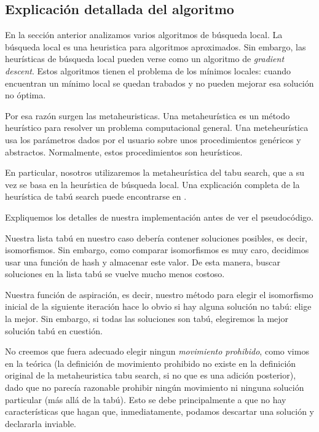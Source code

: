 
\subsection{Explicación detallada del algoritmo}

En la sección anterior analizamos varios algoritmos de búsqueda local.
La búsqueda local es una heuristica para algoritmos aproximados.
Sin embargo, las heurísticas de búsqueda local pueden verse como un algoritmo de \emph{gradient descent}.
Estos algoritmos tienen el problema de los mínimos locales: cuando encuentran un mínimo local se quedan trabados y no pueden mejorar esa solución no óptima. 

Por esa razón surgen las metaheuristicas.
Una metaheurística es un método heurístico para resolver un  problema computacional general.
Una meteheurística usa los parámetros dados por el usuario sobre unos procedimientos genéricos y abstractos. 
Normalmente, estos procedimientos son heurísticos.

En particular, nosotros utilizaremos la metaheurística del tabu search, que a su vez se basa en la heurística de búsqueda local.
Una explicación completa de la heurística de tabú search puede encontrarse en \cite{tabusearch}.

Expliquemos los detalles de nuestra implementación antes de ver el pseudocódigo.

Nuestra lista tabú en nuestro caso debería contener soluciones posibles, es decir, isomorfismos. Sin embargo, como comparar isomorfismos es muy caro, decidimos usar una función de hash y almacenar este valor. De esta manera, buscar soluciones en la lista tabú se vuelve mucho menos costoso.

Nuestra función de aspiración, es decir, nuestro método para elegir el isomorfismo inicial de la siguiente iteración hace lo obvio si hay alguna solución no tabú: elige la mejor.
Sin embargo, si todas las soluciones son tabú, elegiremos la mejor solución tabú en cuestión.

No creemos que fuera adecuado elegir ningun \emph{movimiento prohibido}, como vimos en la teórica (la definición de movimiento prohibido no existe en la definición original de la metaheuristica tabu search, si no que es una adición posterior), dado que no parecía razonable prohibir ningún movimiento ni ninguna solución particular (más allá de la tabú).
Esto se debe principalmente a que no hay características que hagan que, inmediatamente, podamos descartar una solución y declararla inviable.

